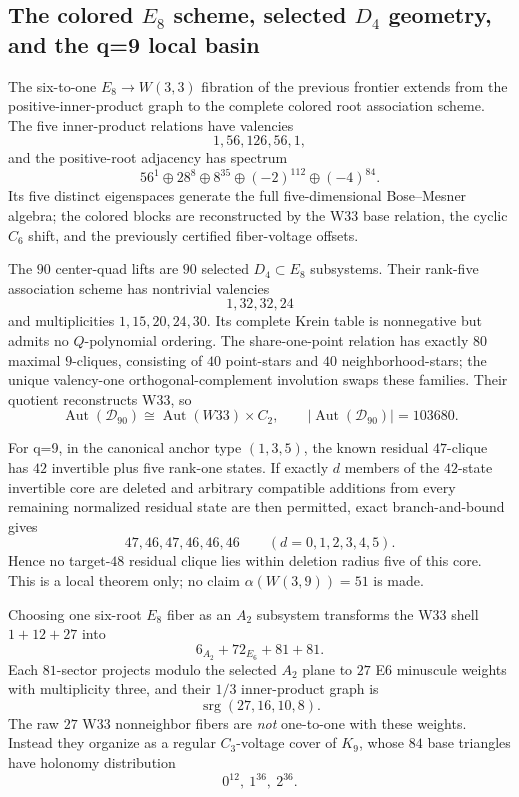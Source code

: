 \subsection{The colored $E_8$ scheme, selected $D_4$ geometry, and the q=9 local basin}
\label{sec:pass7171-7186-e8-d4-q9}

The six-to-one $E_8\to W(3,3)$ fibration of the previous frontier extends from the positive-inner-product graph to the complete colored root association scheme.  The five inner-product relations have valencies
\[
 \boxed{1,56,126,56,1},
\]
and the positive-root adjacency has spectrum
\[
 \boxed{56^1\oplus 28^8\oplus 8^{35}\oplus(-2)^{112}\oplus(-4)^{84}}.
\]
Its five distinct eigenspaces generate the full five-dimensional Bose--Mesner algebra; the colored blocks are reconstructed by the W33 base relation, the cyclic $C_6$ shift, and the previously certified fiber-voltage offsets.

The $90$ center-quad lifts are $90$ selected $D_4\subset E_8$ subsystems.  Their rank-five association scheme has nontrivial valencies
\[
 \boxed{1,32,32,24}
\]
and multiplicities $1,15,20,24,30$.  Its complete Krein table is nonnegative but admits no $Q$-polynomial ordering.  The share-one-point relation has exactly $80$ maximal $9$-cliques, consisting of $40$ point-stars and $40$ neighborhood-stars; the unique valency-one orthogonal-complement involution swaps these families.  Their quotient reconstructs W33, so
\[
 \boxed{\operatorname{Aut}(\mathcal D_{90})\cong\operatorname{Aut}(W33)\times C_2},
 \qquad |\operatorname{Aut}(\mathcal D_{90})|=103680.
\]

For q=9, in the canonical anchor type $(1,3,5)$, the known residual $47$-clique has $42$ invertible plus five rank-one states.  If exactly $d$ members of the $42$-state invertible core are deleted and arbitrary compatible additions from every remaining normalized residual state are then permitted, exact branch-and-bound gives
\[
 \boxed{47,46,47,46,46,46\qquad(d=0,1,2,3,4,5)}.
\]
Hence no target-$48$ residual clique lies within deletion radius five of this core.  This is a local theorem only; no claim $\alpha(W(3,9))=51$ is made.

Choosing one six-root $E_8$ fiber as an $A_2$ subsystem transforms the W33 shell $1+12+27$ into
\[
 \boxed{6_{A_2}+72_{E_6}+81+81}.
\]
Each $81$-sector projects modulo the selected $A_2$ plane to $27$ E6 minuscule weights with multiplicity three, and their $1/3$ inner-product graph is
\[
 \boxed{\operatorname{srg}(27,16,10,8)}.
\]
The raw $27$ W33 nonneighbor fibers are \emph{not} one-to-one with these weights.  Instead they organize as a regular $C_3$-voltage cover of $K_9$, whose $84$ base triangles have holonomy distribution
\[
 \boxed{0^{12},\ 1^{36},\ 2^{36}}.
\]

